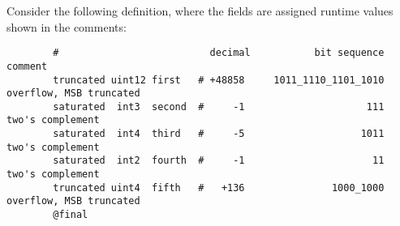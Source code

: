 \begin{remark}
    Consider the following definition,
    where the fields are assigned runtime values shown in the comments:

    \begin{verbatim}
        #                          decimal           bit sequence   comment
        truncated uint12 first   # +48858     1011_1110_1101_1010   overflow, MSB truncated
        saturated  int3  second  #     -1                     111   two's complement
        saturated  int4  third   #     -5                    1011   two's complement
        saturated  int2  fourth  #     -1                      11   two's complement
        truncated uint4  fifth   #   +136               1000_1000   overflow, MSB truncated
        @final
    \end{verbatim}


\end{remark}
